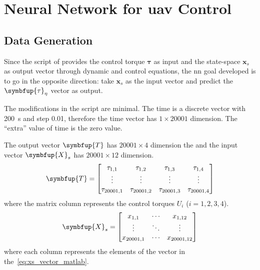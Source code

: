 \section{Neural Network for \gls*{uav} Control}

\subsection{Data Generation}

Since the script of \citet{geronel2023} provides the control torque \(\symbf{\tau}\) as input and the state-space \(\symbf{x}_s\) as output vector through dynamic and control equations, the \gls*{nn} goal developed is to go in the opposite direction: take \(\symbf{x}_s\) as the input vector and predict the \(\symbfup{\tau}_{\eta}\) vector as output.

The modifications in the script are minimal.
The time is a discrete vector with \SI{200}{s} and step 0.01, therefore the time vector has \(1\times 20001\) dimension.
The ``extra'' value of time is the zero value.

The output vector \(\symbfup{T}\) has \(20001\times 4\) dimension the and the input vector \(\symbfup{X}_s\) has  \(20001\times 12\) dimension.
%
\begin{equation}\label{eq:tau_input}
    \symbfup{T} = \begin{bmatrix}
        \tau_{1,1}      & \tau_{1,2}      & \tau_{1,3}      & \tau_{1,4} \\
        \vdots       & \vdots       & \vdots       & \vdots  \\
        \tau_{20001, 1} & \tau_{20001, 2} & \tau_{20001, 3} & \tau_{20001, 4} 
    \end{bmatrix}
\end{equation}
%
where the matrix column represents the control torques \(U_i\) (\(i=1,2,3,4\)).
%
\begin{equation}\label{eq:xs_output}
    \symbfup{X}_s = \begin{bmatrix}
        x_{1,1}      & \cdots & x_{1,12} \\
        \vdots       & \ddots & \vdots \\
        x_{20001, 1} & \cdots & x_{20001, 12} 
    \end{bmatrix}
\end{equation}
%
where each column represents the elements of the vector in the~\cref{eq:xs_vector_matlab}.

